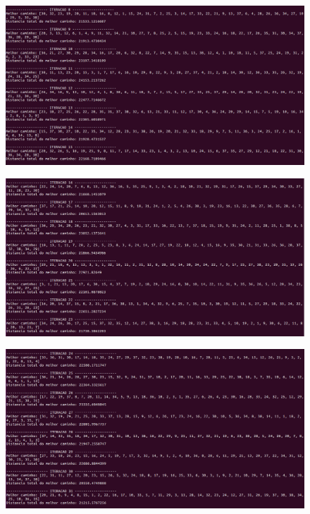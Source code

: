 \documentclass[hidelinks,12pt]{article}
\begin{document}
		\newpage

		\begin{figure}[!h]
			\centering
			\includegraphics[scale=0.3]{Figures/m38-2-2.png}
		\end{figure}

		\newpage

		\begin{figure}[!h]
			\centering
			\includegraphics[scale=0.3]{Figures/m38-2-3.png}
		\end{figure}

		\newpage

		\begin{figure}[!h]
			\centering
			\includegraphics[scale=0.3]{Figures/m38-2-4.png}
		\end{figure}
\end{document}

